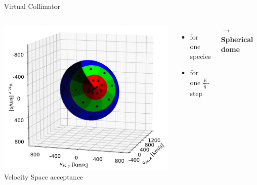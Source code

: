 \documentclass{beamer}
\begin{document}
\begin{frame}{Virtual Collimator}
	\begin{columns}
		\column[]{7cm}
		\vspace{.5cm}
		\includegraphics[scale=0.45]{Pics/figure_1-1_swics.pdf}
		\column[]{3.5cm}
		Velocity Space acceptance
		\begin{itemize}
			\item for one species
			\item for one $\frac{E}{q}$-step
		\end{itemize}
		\vspace{0.5cm}
		$\rightarrow$ \textbf{Spherical dome}
	\end{columns}
	
\end{frame}

\end{document}
